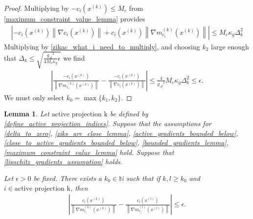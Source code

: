 \documentclass{article}
\newtheorem{lemma}[theorem]{Lemma}
\theoremstyle{case}
\numberwithin{theorem}{subsection}
\newcommand{\dk}{\Delta_k}
\newcommand{\gmcik}{{\nabla m_{c_i}^{(k)}\left(\xk\right)}}
\newcommand{\gmcil}{{\nabla m_{c_i}^{(l)}\left(\xl\right)}}
\newcommand{\minactivegrad}{{ g_{\mathcal A} }}
\newcommand{\naturals}{\mathbb N}
\newcommand{\xk}{x^{(k)}}
\newcommand{\xl}{{x^{(l)}}}
\newcommand{\activeprojk}{{\textrm{active projection k}}}
\begin{document}
\begin{proof}
Multiplying by $-c_i\left(\xk\right) \le M_c$ from \cref{maximum_constraint_value_lemma} provides
\begin{align*}
\left|-c_i\left(\xk\right)\left\|\nabla c_i\left(\xk \right)\right\| + c_i\left(\xk\right)\left\|\gmcik\right\|\right| \le M_c \kappa_g \dk^2
\end{align*}
Multiplying by \cref{zikac_what_i_need_to_multiply}, and choosing $k_2$ large enough that 
$\dk \le \sqrt{\frac{\minactivegrad^2}{4M_c \kappa_g} \epsilon}$
we find
\begin{align*}
\left|\frac{-c_i\left(\xk \right)}{\left\|\gmcik\right\|} 
- \frac{-c_i\left(\xk \right)}{\left\|\nabla c_i\left(\xk \right)\right\|} \right|
\le \frac4{\minactivegrad^2} M_c \kappa_g \dk^2
\le \epsilon.
\end{align*}
We must only select $k_0 = \max\{k_1, k_2\}$.
\end{proof}





\begin{lemma}
\label{forgot_where_i_am}
Let $\activeprojk$ be defined by \cref{define_active_projection_indices}.
Suppose that the assumptions for
\cref{delta_to_zero},
\cref{ziks_are_close_lemma},
\cref{active_gradients_bounded_below},
\cref{close_to_active_gradients_bounded_below},
\cref{bounded_gradients_lemma},
\cref{maximum_constraint_value_lemma}
hold.
Suppose that \cref{lipschitz_gradients_assumption} holds.





Let $\epsilon > 0$ be fixed.
There exists a $k_0 \in \naturals$ such that if $k, l \ge k_0$ and $i \in \activeprojk$, then
\begin{align*}
\left|
\frac{c_i\left(\xk\right)}{\left\|\gmcik\right\|} - \frac{c_i\left(\xl\right)}{\left\|\gmcil\right\|} 
\right| \le \epsilon.
\end{align*}
\end{lemma}
\end{document}
